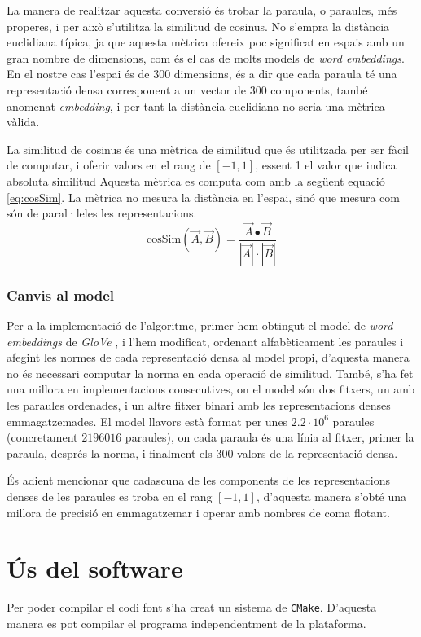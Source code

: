 \documentclass[catalan,10pt,a4paper]{article}
\begin{document}
La manera de realitzar aquesta conversió és trobar la paraula, o paraules, més properes, i per això s'utilitza la similitud de cosinus. No s'empra la distància euclidiana típica, ja que aquesta mètrica ofereix poc significat en espais amb un gran nombre de dimensions, com és el cas de molts models de \textit{word embeddings}. En el nostre cas l'espai és de 300 dimensions, és a dir que cada paraula té una representació densa corresponent a un vector de 300 components, també anomenat \textit{embedding}, i per tant la distància euclidiana no seria una mètrica vàlida.

La similitud de cosinus \cite{Cosinesi72:online} és una mètrica de similitud que és utilitzada per ser fàcil de computar, i oferir valors en el rang de $[-1,1]$, essent 1 el valor que indica absoluta similitud Aquesta mètrica es computa com amb la següent equació \ref{eq:cosSim}. La mètrica no mesura la distància en l'espai, sinó que mesura com són de paral·leles les representacions.
\begin{equation} \label{eq:cosSim}
	\text{cosSim}(\vec A,\vec B) = \frac{\vec A\bullet \vec B}{|\vec A|\cdot|\vec B|}
\end{equation}

\subsubsection*{Canvis al model}
Per a la implementació de l'algoritme, primer hem obtingut el model de \textit{word embeddings} de \textit{GloVe} \cite{GloVeGlo18:online}, i l'hem modificat, ordenant alfabèticament les paraules i afegint les normes de cada representació densa al model propi, d'aquesta manera no és necessari computar la norma en cada operació de similitud. També, s'ha fet una millora en implementacions consecutives, on el model són dos fitxers, un amb les paraules ordenades, i un altre fitxer binari amb les representacions denses emmagatzemades. El model llavors està format per unes $2.2\cdot 10^{6}$ paraules (concretament $2196016$ paraules), on cada paraula és una línia al fitxer, primer la paraula, després la norma, i finalment els 300 valors de la representació densa.	

És adient mencionar que cadascuna de les components de les representacions denses de les paraules es troba en el rang $[-1,1]$, d'aquesta manera s'obté una millora de precisió en emmagatzemar i operar amb nombres de coma flotant.

\section*{Ús del software}
Per poder compilar el codi font s'ha creat un sistema de \verb|CMake|. D'aquesta manera es pot compilar el programa independentment de la plataforma.
\end{document}
